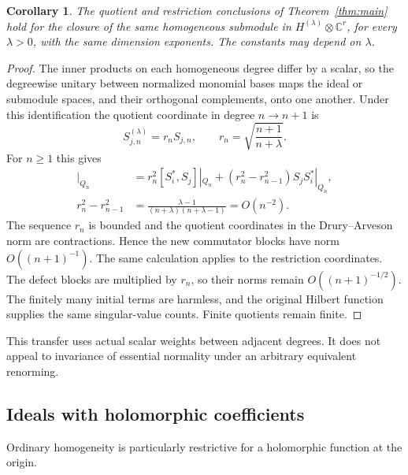 \documentclass[11pt,reqno]{amsart}
\numberwithin{equation}{section}
\newtheorem{corollary}[theorem]{Corollary}
\theoremstyle{definition}
\theoremstyle{remark}
\newcommand{\C}{\mathbb C}
\begin{document}
\begin{corollary}\label{ext:kernel-family}
The quotient and restriction conclusions of Theorem~\ref{thm:main}
hold for the closure of the same homogeneous submodule in
$H^{(\lambda)}\otimes\C^r$, for every $\lambda>0$, with the same
dimension exponents.  The constants may depend on $\lambda$.
\end{corollary}
\begin{proof}
The inner products on each homogeneous degree differ by a scalar,
so the degreewise unitary between normalized monomial bases maps the
ideal or submodule spaces, and their orthogonal complements, onto
one another.  Under this identification the quotient coordinate in
degree $n\to n+1$ is
\[
 S_{j,n}^{(\lambda)}=r_nS_{j,n},\qquad
 r_n=\sqrt{\frac{n+1}{n+\lambda}}.
\]
For $n\ge1$ this gives
\begin{align*}
 [(S_i^{(\lambda)})^*,S_j^{(\lambda)}]|_{Q_n}
 &=r_n^2[S_i^*,S_j]|_{Q_n}
   +(r_n^2-r_{n-1}^2)S_jS_i^*|_{Q_n},\\
 r_n^2-r_{n-1}^2
 &=\frac{\lambda-1}{(n+\lambda)(n+\lambda-1)}=O(n^{-2}).
\end{align*}
The sequence $r_n$ is bounded and the quotient coordinates in the
Drury--Arveson norm are contractions.  Hence the new commutator blocks
have norm $O((n+1)^{-1})$.  The same calculation applies to the
restriction coordinates.  The defect blocks are multiplied by $r_n$,
so their norms remain $O((n+1)^{-1/2})$.  The finitely many initial
terms are harmless, and the original Hilbert function supplies the
same singular-value counts.  Finite quotients remain finite.
\end{proof}

This transfer uses actual scalar weights between adjacent degrees.
It does not appeal to invariance of essential normality under an
arbitrary equivalent renorming.

\subsection{Ideals with holomorphic coefficients}
Ordinary homogeneity is particularly restrictive for a holomorphic
function at the origin.
\end{document}
